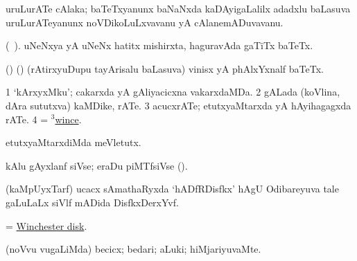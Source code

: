 \bentry
{}
\gl{\nA}
\bmng
uruLurATe cAlaka; baTeTxyanunx baNaNxda kaDAyigaLalilx adadxlu baLasuva uruLurATeyanunx noVDikoLuLxvavanu yA cAlanemADuvavanu. 
\emng
\eentry

\bentry
{}
\gl{\nA} (\bava\ ). 
\bmng
uNeNxya yA uNeNx hatitx mishirxta, haguravAda gaTiTx baTeTx. 
\emng
\eentry

\bentry
{}
\gl{\nA}
\bmng
(\birx) (\kanmu) (rAtirxyuDupu tayArisalu baLasuva) vinisx yA phAlxYxnalf baTeTx. 
\emng
\eentry

\bentry
{} 
\gl{\nA}
\expl{}
\bmng
\bnum
\num{1} `kArxyxMku'; cakarxda yA gAliyacicxna vakarxdaMDa. 
\num{2} gALada (koVlina, dAra sututxva) kaMDike, rATe. 
\num{3} acucxrATe; etutxyaMtarxda yA hAyihagagxda rATe. 
\num{4} = \hyperlink{wince(3)}{$^3$wince}. 
\enum
\emng
\eentry

\bentry
{} 
\gl{\sakirx}
\bmng
etutxyaMtarxdiMda meVletutx. 
\emng
\eentry

\bentry
{} 
\gl{\nA}
\expl{}
\bmng
kAlu gAyxlanf siVse; eraDu piMTfsiVse (). 
\emng
\eentry

\bentry
{} 
\gl{\nA}
\bmng
(kaMpUyxTarf) ucacx sAmathaRyxda `hADfRDisfkx' hAgU Odibareyuva tale gaLuLaLx siVlf mADida DisfkxDerxYvf. 
\emng
\eentry

\bentry
{}
\gl{\nA}
\bmng
= \hyperlink{Winchester disk}{Winchester disk}. 
\emng
\eentry

\bentry
{}
\gl{\kirxvi}
\bmng
(noVvu \mo vugaLiMda) becicx; bedari; aLuki; hiMjariyuvaMte. 
\emng
\eentry


